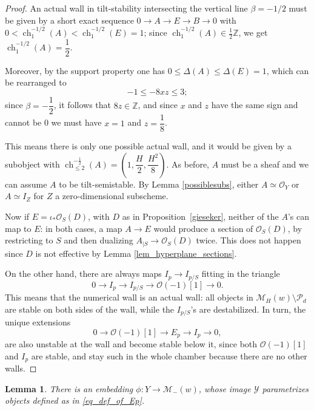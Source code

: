 \documentclass[11pt]{amsart}
\newtheorem{lemma}[thm]{Lemma}
\theoremstyle{definition}
\newcommand{\C}{\mathbb{C}}
\newcommand{\Z}{\mathbb{Z}}
\DeclareMathOperator{\Ch}{ch}
\DeclareMathOperator{\Sets}{Sets}
\DeclareMathOperator{\Sch}{Sch}
\newcommand{\sO}{\mathcal{O}}
\newcommand{\sY}{\mathcal{Y}}
\newcommand{\sM}{\mathcal{M}}
\newcommand{\sE}{\mathcal{E}}
\renewcommand{\P}{\mathbb{P}}
\newcommand{\sI}{\mathcal{I}}
\begin{document}
\begin{proof}
An actual wall in tilt-stability intersecting the vertical line $\beta=-1/2$ must be given by a short exact sequence $0\to A \to E \to B \to 0$ with $0< \Ch_1^{-1/2}(A)< \Ch_1^{-1/2}(E)=1$; since $\Ch_1^{-1/2}(A)\in \frac{1}{2}\Z$, we get $\Ch_1^{-1/2}(A)=\dfrac{1}{2}$.

Moreover, by the support property one has $0 \leq \Delta(A) \leq \Delta(E)=1$, which can be rearranged to
\[
-1 \leq -8xz \leq 3;
\]
since $\beta=-\dfrac{1}{2}$, it follows that  $8z \in \Z$, and since $x$ and $z$ have the same sign and cannot be 0 we must have $x=1$ and $z=\dfrac{1}{8}$.

This means there is only one possible actual wall, and it would be given by a subobject with $\Ch^{-\frac{1}{2}}_{\leq 2}(A)=\left(1,\dfrac{H}{2},\dfrac{H^2}{8}\right)$. As before, $A$ must be a sheaf and we can assume $A$ to be tilt-semistable. By Lemma \ref{possiblesubs}, either $A\simeq \sO_Y$ or $A\simeq I_Z$ for $Z$ a zero-dimensional subscheme.

Now if $E=\iota_*\sO_S(D)$, with $D$ as in Proposition~\ref{gieseker}, neither of the $A$'s can map to $E$: in both cases, a map $A\to E$ would produce a section of $\sO_S(D)$, by restricting to $S$ and then dualizing $A_{|S} \to \sO_S(D)$ twice. This does not happen since $D$ is not effective by Lemma \ref{lem_hyperplane_sections}.

On the other hand, there are always maps $I_p \to I_{p/S}$ fitting in the triangle
\[
0\to I_p \to I_{p/S} \to \sO(-1)[1]\to 0.
\]
This means that the numerical wall is an actual wall: all objects in $\sM_H(w) \setminus \mathcal{P}_d$ are stable on both sides of the wall, while the $I_{p/S}$'s are destabilized. In turn, the unique extensions
\[
0 \to \sO(-1)[1]\to E_p \to I_p \to 0,
\]
are also unstable at the wall and become stable below it, since both $\sO(-1)[1]$ and $I_p$ are stable, and stay such in the whole chamber because there are no other walls.
\end{proof}

\begin{lemma}\label{lem_Families_IpEp}
There is an embedding $\phi\colon Y\to \sM_-(w)$, whose image $\mathcal Y$ parametrizes objects defined as in \eqref{eq_def_of_Ep}.
\end{lemma}
\end{document}
